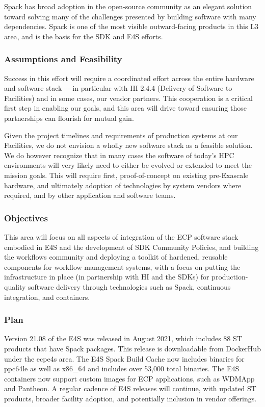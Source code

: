 Spack has broad adoption in the open-source community as an elegant solution toward solving many of the challenges presented by building software with many dependencies. Spack is one of the most visible outward-facing products in this L3 area, and is the basis for the SDK and E4S efforts.

\subsubsection{Assumptions and Feasibility}
Success in this effort will require a coordinated effort across the entire hardware and software stack –- in particular with HI 2.4.4 (Delivery of Software to Facilities) and in some cases, our vendor partners.  This cooperation is a critical first step in enabling our goals, and this area will drive toward ensuring those partnerships can flourish for mutual gain.

Given the project timelines and requirements of production systems at our Facilities, we do not envision a wholly new software stack as a feasible solution. We do however recognize that in many cases the software of today's HPC environments will very likely need to either be evolved or extended to meet the mission goals. This will require first, proof-of-concept on existing pre-Exascale hardware, and ultimately adoption of technologies by system vendors where required, and by other application and software teams.

\subsubsection{Objectives}
This area will focus on all aspects of integration of the ECP software stack embodied in E4S and the development of SDK Community Policies, and building the workflows community and deploying a toolkit of hardened, reusable components for workflow management systems, with a focus on putting the infrastructure in place (in partnership with HI and the SDKs) for production-quality software delivery through technologies such as Spack, continuous integration, and containers. 

\subsubsection{Plan}
Version 21.08 of the E4S was released in August 2021, which includes 88 ST products that have Spack packages. This release is downloadable from DockerHub under the ecpe4s area.  The E4S Spack Build Cache now includes binaries for ppc64le as well as x86\_64 and includes over 53,000 total binaries.  The E4S containers now support custom images for ECP applications, such as WDMApp and Pantheon.  A regular cadence of E4S releases will continue, with updated ST products, broader facility adoption, and potentially inclusion in vendor offerings.

